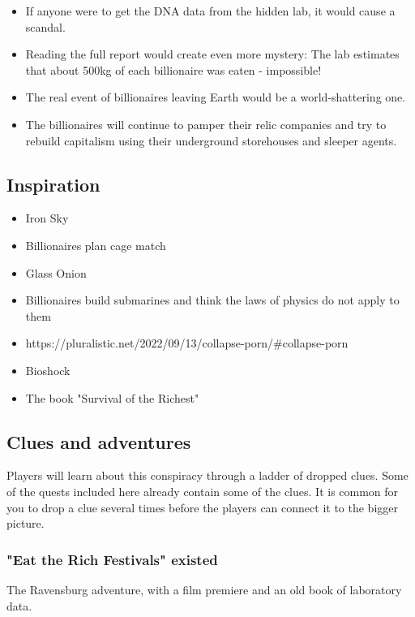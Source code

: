 \begin{itemize}
    \item If anyone were to get the DNA data from the hidden lab, it would cause a scandal.
    \item Reading the full report would create even more mystery: The lab estimates that about 500kg of each billionaire was eaten - impossible!
    \item The real event of billionaires leaving Earth would be a world-shattering one.
    \item The billionaires will continue to pamper their relic companies and try to rebuild capitalism using their underground storehouses and sleeper agents.
\end{itemize}


\subsection{Inspiration}

\begin{itemize}
    \item Iron Sky
    \item Billionaires plan cage match
    \item Glass Onion
    \item Billionaires build submarines and think the laws of physics do not apply to them
    \item https://pluralistic.net/2022/09/13/collapse-porn/#collapse-porn
    \item Bioshock
    \item The book "Survival of the Richest"
\end{itemize}

\subsection{Clues and adventures}

Players will learn about this conspiracy through a ladder of dropped clues. Some of the quests included here already contain some of the clues. It is common for you to drop a clue several times before the players can connect it to the bigger picture.

\subsubsection{"Eat the Rich Festivals" existed}

The Ravensburg adventure, with a film premiere and an old book of laboratory data.

